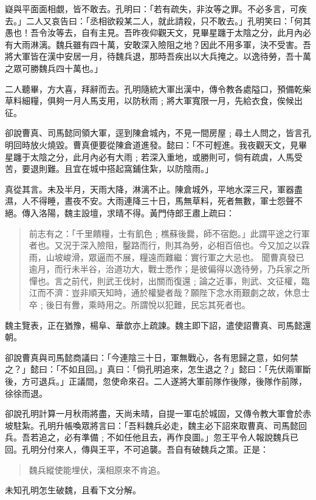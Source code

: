 嶷與平面面相覷，皆不敢去。孔明曰：「若有疏失，非汝等之罪。不必多言，可疾去。」二人又哀告曰：「丞相欲殺某二人，就此請殺，只不敢去。」孔明笑曰：「何其愚也！吾令汝等去，自有主見。吾昨夜仰觀天文，見畢星躔于太陰之分，此月內必有大雨淋漓。魏兵雖有四十萬，安敢深入險阻之地？因此不用多軍，決不受害。吾將大軍皆在漢中安居一月，待魏兵退，那時吾疾出以大兵掩之。以逸待勞，吾十萬之眾可勝魏兵四十萬也。」

二人聽畢，方大喜，拜辭而去。孔明隨統大軍出漢中，傳令教各處隘口，預備乾柴草料細糧，俱夠一月人馬支用，以防秋雨﹔將大軍寬限一月，先給衣食，俟候出征。

卻說曹真、司馬懿同領大軍，逕到陳倉城內，不見一間房屋﹔尋土人問之，皆言孔明回時放火燒毀。曹真便要從陳倉道進發。懿曰：「不可輕進。我夜觀天文，見畢星躔于太陰之分，此月內必有大雨﹔若深入重地，或勝則可，倘有疏虞，人馬受苦，要退則難。且宜在城中搭起窩鋪住紮，以防陰雨。」

真從其言。未及半月，天雨大降，淋漓不止。陳倉城外，平地水深三尺，軍器盡濕，人不得睡，晝夜不安。大雨連降三十日，馬無草料，死者無數，軍士怨聲不絕。傳入洛陽，魏主設壇，求晴不得。黃門侍郎王肅上疏曰：

\begin{quote}
前志有之：「千里饋糧，士有飢色﹔樵蘇後爨，師不宿飽。」此謂平途之行軍者也。又況于深入險阻，鑿路而行，則其為勞，必相百倍也。今又加之以霖雨，山坡峻滑，眾逼而不展，糧遠而難繼：實行軍之大忌也。
聞曹真發已逾月，而行未半谷，治道功大，戰士悉作；是彼偏得以逸待勞，乃兵家之所憚也。言之前代，則武王伐紂，出關而復還﹔論之近事，則武、文征權，臨江而不濟：豈非順天知時，通於權變者哉？願陛下念水雨艱劇之故，休息士卒﹔後日有釁，乘時用之。所謂悅以犯難，民忘其死者也。
\end{quote}

魏主覽表，正在猶豫，楊阜、華歆亦上疏諫。魏主即下詔，遣使詔曹真、司馬懿還朝。

卻說曹真與司馬懿商議曰：「今連陰三十日，軍無戰心，各有思歸之意，如何禁之？」懿曰：「不如且回。」真曰：「倘孔明追來，怎生退之？」懿曰：「先伏兩軍斷後，方可退兵。」正議間，忽使命來召。二人遂將大軍前隊作後隊，後隊作前隊，徐徐而退。

卻說孔明計算一月秋雨將盡，天尚未晴，自提一軍屯於城固，又傳令教大軍會於赤坡駐紮。孔明升帳喚眾將言曰：「吾料魏兵必走，魏主必下詔來取曹真、司馬懿回兵。吾若追之，必有準備﹔不如任他且去，再作良圖。」忽王平令人報說魏兵已回。孔明分付來人，傳與王平，不可追襲。吾自有破魏兵之策。正是：

\begin{quote}
魏兵縱使能埋伏，漢相原來不肯追。
\end{quote}

未知孔明怎生破魏，且看下文分解。
